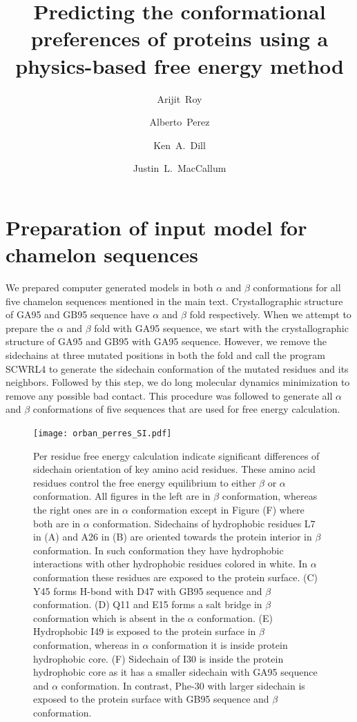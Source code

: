 \documentclass[12pt]{article}
\author{Arijit~Roy}
\author{Alberto~Perez}
\author{Ken~A.~Dill}
\author{Justin~L.~MacCallum}
\affil{Laufer Center for Physical and Quantitative Biology\\
    and Departments of Physics and Chemistry\\
    Stony Brook University\\
    Stony Brook, NY 11794-5252.}
\title{Predicting the conformational preferences of proteins using a physics-based free energy
method}
\begin{document}
\maketitle


\section*{Preparation of input model for chamelon sequences}

We prepared computer generated models in both $\alpha$ and $\beta$ conformations for all five chamelon sequences mentioned 
in the main text. Crystallographic structure of GA95 and GB95 sequence have $\alpha$ and $\beta$ fold respectively. When
we attempt to prepare the $\alpha$ and $\beta$ fold with GA95 sequence, we start with the crystallographic 
structure of GA95 and GB95 with GA95 sequence. However, we remove the sidechains at three mutated positions in both the fold 
and call the program SCWRL4 \cite{Krivov2009} to generate the sidechain conformation of the mutated residues and its neighbors. Followed by 
this step, we do long molecular dynamics
minimization to remove any possible bad contact. This procedure was followed to generate all $\alpha$ and 
$\beta$ conformations of five sequences that are used for free energy calculation.   

\setcounter{figure}{0}
\makeatletter 
\renewcommand{\thefigure}{S\@arabic\c@figure}
\begin{figure}
\texttt{[image: orban\_perres\_SI.pdf]}
\label{fig:orban_full}
\caption{Per residue free energy calculation indicate significant differences of sidechain orientation of key amino acid residues. These amino acid
residues control the free energy equilibrium to either $\beta$ or
$\alpha$ conformation. All figures in the left are in $\beta$ conformation, whereas the right ones are in $\alpha$ conformation except in Figure (F) 
where both are in $\alpha$ conformation.
Sidechains of hydrophobic residues L7 in (A) and A26 in (B) are oriented towards the protein interior in $\beta$ 
conformation. In such conformation they have hydrophobic interactions with other hydrophobic residues colored in white. In $\alpha$ conformation these residues are 
exposed to the protein surface.  
(C) Y45 forms H-bond with D47 with GB95 sequence and $\beta$ conformation. (D) Q11 and E15 forms a salt bridge in $\beta$ conformation which is absent
in the $\alpha$ conformation. (E) Hydrophobic I49 is exposed to the protein surface in $\beta$ conformation, whereas in $\alpha$ conformation it 
is inside protein hydrophobic core. (F) Sidechain of I30 is inside the protein hydrophobic core as it has a smaller sidechain with GA95 sequence 
and $\alpha$ conformation. In contrast, Phe-30 with larger sidechain is exposed to the protein surface with GB95 sequence and $\beta$ conformation.}
\end{figure}
\end{document}
